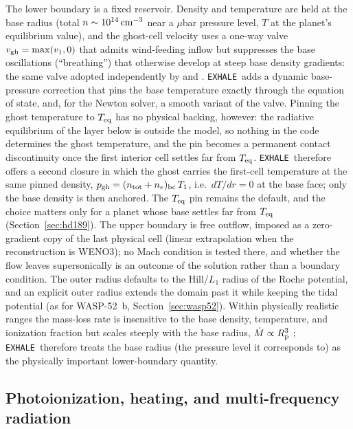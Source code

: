 \documentclass[twocolumn]{aastex702}
\newcommand{\EXHALE}{\texttt{EXHALE}}
\newcommand{\Rp}{R_{\rm p}}
\newcommand{\Mdot}{\dot{M}}
\begin{document}
The lower boundary is a fixed reservoir. Density and temperature are held at the base
radius (total $n\sim10^{14}\,{\rm cm}^{-3}$ near a $\mu$bar pressure level, $T$ at the
planet's equilibrium value), and the ghost-cell velocity uses a one-way valve
$v_{\rm gh}=\max(v_1,0)$ that admits wind-feeding inflow but suppresses the base
oscillations (``breathing'') that otherwise develop at steep base density gradients:
the same valve adopted independently by \citet{Caldiroli2021} and \citet{Salz2016}.
\EXHALE\ adds a dynamic base-pressure correction that pins the base temperature exactly
through the equation of state, and, for the Newton solver, a smooth variant of the valve.
Pinning the ghost temperature to $T_{\rm eq}$ has no physical backing, however: the
radiative equilibrium of the layer below is outside the model, so nothing in the code
determines the ghost temperature, and the pin becomes a permanent contact discontinuity
once the first interior cell settles far from $T_{\rm eq}$. \EXHALE\ therefore offers a
second closure in which the ghost carries the first-cell temperature at the same pinned
density, $p_{\rm gh}=(n_{\rm tot}+n_e)_{\rm bc}\,T_1$, i.e.\ $dT/dr=0$ at the base face;
only the base density is then anchored. The $T_{\rm eq}$ pin remains the default, and the
choice matters only for a planet whose base settles far from $T_{\rm eq}$
(Section~\ref{sec:hd189}).
The upper boundary is free outflow, imposed as a zero-gradient copy of the last physical
cell (linear extrapolation when the reconstruction is WENO3); no Mach condition is tested
there, and whether the flow leaves supersonically is an outcome of the solution rather
than a boundary condition. The outer radius defaults to the Hill/$L_1$ radius of the Roche
potential, and an explicit outer radius extends the domain past it while keeping the tidal
potential (as for WASP-52~b, Section~\ref{sec:wasp52}). Within physically realistic ranges the
mass-loss rate is insensitive to the base density, temperature, and ionization fraction
but scales steeply with the base radius, $\Mdot\propto\Rp^3$
\citep{MurrayClay2009,Salz2016}; \EXHALE\ therefore treats the base radius (the pressure
level it corresponds to) as the physically important lower-boundary quantity.

\subsection{Photoionization, heating, and multi-frequency radiation}
\label{sec:photoion}
\end{document}
